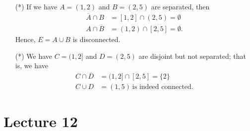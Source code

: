 \documentclass[a4paper]{report}
\begin{document}
\begin{eg}
\begin{enumerate}
    \item[(*)] If we have \( A = (1,2)  \) and \( B = (2,5) \) are separated, then
        \begin{align*}
            \overline{A} \cap B &= [1,2] \cap (2,5) = \emptyset \\
            A \cap \overline{B} &= (1,2) \cap [2,5] = \emptyset.
        \end{align*}
        Hence, \( E = A \cup B  \) is disconnected.
    \item[(*)] We have \( C = (1,2] \) and \( D = (2,5) \) are disjoint but not separated; that is, we have
        \begin{align*}
            C \cap \overline{D} &= (1,2] \cap [2,5] = \{ 2 \}  \\
            C \cup D &= (1,5) \ \text{is indeed connected.}
        \end{align*}
\end{enumerate}    
\end{eg}

\section{Lecture 12}
\end{document}
